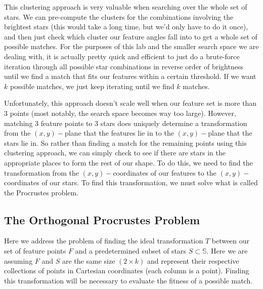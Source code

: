 \documentclass[paper=a4, fontsize=11pt]{scrartcl} %
\begin{document}
This clustering approach is very valuable when searching over the whole set of stars. We can pre-compute the clusters for the combinations involving the brightest stars (this would take a long time, but we'd only have to do it once), and then just check which cluster our feature angles fall into to get a whole set of possible matches. For the purposes of this lab and the smaller search space we are dealing with, it is actually pretty quick and efficient to just do a brute-force iteration through all possible star combinations in reverse order of brightness until we find a match that fits our features within a certain threshold. If we want $k$ possible matches, we just keep iterating until we find $k$ matches.



Unfortunately, this approach doesn't scale well when our feature set is more than 3 points (most notably, the search space becomes way too large). However, matching 3 feature points to 3 stars does uniquely determine a transformation from the $(x,y)-$plane that the features lie in to the $(x,y)-$plane that the stars lie in. So rather than finding a match for the remaining points using this clustering approach, we can simply check to see if there are stars in the appropriate places to form the rest of our shape. To do this, we need to find the transformation from the $(x,y)-$coordinates of our features to the $(x,y)-$coordinates of our stars. To find this transformation, we must solve what is called the Procrustes problem.

\subsection{The Orthogonal Procrustes Problem\cite{Everson1997}}
Here we address the problem of finding the ideal transformation $T$ between our set of feature points $F$ and a predetermined subset of stars $S\subset \mathbb{S}$. Here we are assuming $F$ and $S$ are the same size $(2\times k)$ and represent their respective collections of points in Cartesian coordinates (each column is a point).  Finding this transformation will be necessary to evaluate the fitness of a possible match.
\end{document}
